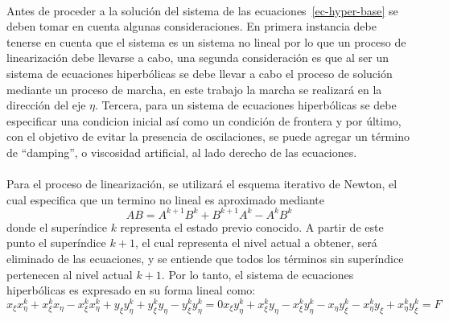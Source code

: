 \documentclass[letterpaper, openright, 12pt]{book}
\begin{document}
    \paragraph*{}
    Antes de proceder a la solución del sistema de las
    ecuaciones~\ref{ec-hyper-base} se deben tomar en cuenta algunas consideraciones. En
    primera instancia debe tenerse en cuenta que el sistema es un sistema no
    lineal por lo que un proceso de linearización debe llevarse a cabo, una
    segunda consideración es que al ser un sistema de ecuaciones
    hiperbólicas se debe llevar a cabo el proceso de solución mediante un
    proceso de marcha, en este trabajo la marcha se realizará en la
    dirección del eje $\eta$. Tercera, para un sistema de ecuaciones
    hiperbólicas se debe especificar una condicion inicial así como un
    condición de frontera y por último, con el objetivo de evitar la
    presencia de oscilaciones, se puede agregar un término de ``damping'', o
    viscosidad artificial, al lado derecho de las ecuaciones.

    \paragraph*{}
        Para el proceso de linearización, se utilizará el esquema iterativo de
        Newton, el cual especifica que un termino no lineal es aproximado
        mediante
        \begin{equation}
            AB = A^{k + 1} B^{k} + B^{k + 1} A^{k} - A^{k} B^{k}
        \end{equation}
        donde el superíndice $k$ representa el estado previo conocido. A partir
        de este punto el superíndice $k + 1$, el cual representa el nivel actual
        a obtener, será eliminado de las ecuaciones, y se entiende que todos los
        términos sin superíndice pertenecen al nivel actual $k + 1$. Por lo
        tanto, el sistema de ecuaciones hiperbólicas es expresado en su forma
        lineal como:
        \begin{subequations}
            \begin{equation}
                x_{\xi} x_{\eta}^{k} + x_{\xi}^{k} x_{\eta} - x_{\xi}^{k} x_{\eta}^{k} + y_{\xi} y_{\eta}^{k} + y_{\xi}^{k} y_{\eta} - y_{\xi}^{k} y_{\eta}^{k} = 0
            \end{equation}
            \begin{equation}
                x_{\xi} y_{\eta}^{k} + x_{\xi}^{k} y_{\eta} - x_{\xi}^{k} y_{\eta}^{k} - x_{\eta} y_{\xi}^{k} - x_{\eta}^{k} y_{\xi} + x_{\eta}^{k} y_{\xi}^{k} = F
            \end{equation}
            \label{ec-hyper-linear}
        \end{subequations}
\end{document}
